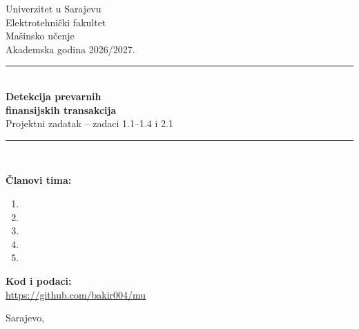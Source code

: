 \begin{titlepage}
\thispagestyle{empty}
\begin{center}
{\large Univerzitet u Sarajevu}\\[3pt]
{\large Elektrotehnički fakultet}\\[11mm]
{\large Mašinsko učenje}\\[2mm]
{\normalsize Akademska godina 2026/2027.}\\[25mm]
{\color{akcent}\rule{\textwidth}{1.5pt}}\\[9mm]
{\huge\bfseries\color{tamnoPlava} Detekcija prevarnih\\[3mm] finansijskih transakcija}\\[8mm]
{\Large Projektni zadatak -- zadaci 1.1--1.4 i 2.1}\\[9mm]
{\color{akcent}\rule{\textwidth}{1.5pt}}\\[14mm]
\begin{minipage}{.72\textwidth}
\textbf{Članovi tima:}\\[4mm]
\begin{enumerate}[leftmargin=1.1cm,itemsep=5pt,topsep=2pt]
  \item \ClanJedan
  \item \ClanDva
  \item \ClanTri
  \item \ClanCetiri
  \item \ClanPet
\end{enumerate}
\vspace{6mm}
\textbf{Kod i podaci:}\\[2mm]
\url{https://github.com/bakir004/mu}
\end{minipage}
\vfill
Sarajevo, \DatumRada
\end{center}
\end{titlepage}

